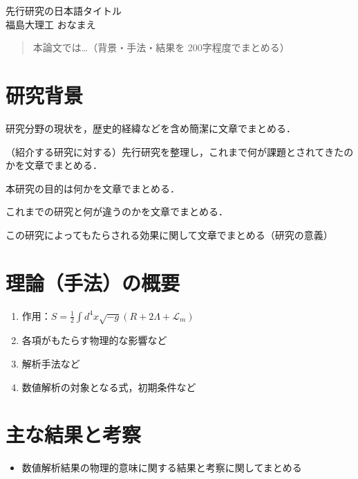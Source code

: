 \documentclass[12pt,a4paper]{jsarticle}
\begin{document}
\vspace{-5pt}
\begin{center}
{\gt \Large 先行研究の日本語タイトル\cite{G_ng_r_2021} }\\[14pt]

{\gt \large 福島大理工 おなまえ}\\[5pt]

\end{center}

\vspace{10pt}

\begin{abstract}
    本論文では…（背景・手法・結果を 200字程度でまとめる）
\end{abstract}

\section{研究背景}
\begin{description}[leftmargin=*]
    \item[分野の状況] 研究分野の現状を，歴史的経緯などを含め簡潔に文章でまとめる．
    \item[分野の課題]（紹介する研究に対する）先行研究を整理し，これまで何が課題とされてきたのかを文章でまとめる．
    \item[研究の目的] 本研究の目的は何かを文章でまとめる．
    \item[新規性] これまでの研究と何が違うのかを文章でまとめる．
    \item[期待される効果] この研究によってもたらされる効果に関して文章でまとめる（研究の意義）
\end{description}

\section{理論（手法）の概要}
\begin{enumerate}[leftmargin=*]
  \item 作用：$S = \frac{1}{2} \int d^4 x \sqrt{-g} \left( R + 2\Lambda + \mathcal{L}_m \right)$
  \item 各項がもたらす物理的な影響など
  \item 解析手法など
  \item 数値解析の対象となる式，初期条件など
\end{enumerate}

\section{主な結果と考察}
\begin{itemize}[leftmargin=*]
  \item 数値解析結果の物理的意味に関する結果と考察に関してまとめる
\end{itemize}
\end{document}
